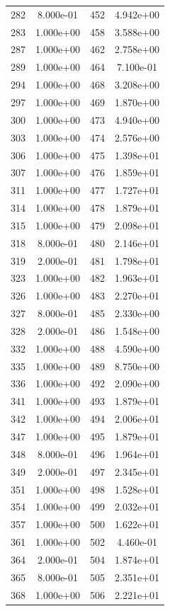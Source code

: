 \documentclass[12pt]{article}
\begin{document}
\begin{longtable}{@{}cccc@{}}
282 & 8.000e-01 & 452 & 4.942e+00 \\
283 & 1.000e+00 & 458 & 3.588e+00 \\
287 & 1.000e+00 & 462 & 2.758e+00 \\
289 & 1.000e+00 & 464 & 7.100e-01 \\
294 & 1.000e+00 & 468 & 3.208e+00 \\
297 & 1.000e+00 & 469 & 1.870e+00 \\
300 & 1.000e+00 & 473 & 4.940e+00 \\
303 & 1.000e+00 & 474 & 2.576e+00 \\
306 & 1.000e+00 & 475 & 1.398e+01 \\
307 & 1.000e+00 & 476 & 1.859e+01 \\
311 & 1.000e+00 & 477 & 1.727e+01 \\
314 & 1.000e+00 & 478 & 1.879e+01 \\
315 & 1.000e+00 & 479 & 2.098e+01 \\
318 & 8.000e-01 & 480 & 2.146e+01 \\
319 & 2.000e-01 & 481 & 1.798e+01 \\
323 & 1.000e+00 & 482 & 1.963e+01 \\
326 & 1.000e+00 & 483 & 2.270e+01 \\
327 & 8.000e-01 & 485 & 2.330e+00 \\
328 & 2.000e-01 & 486 & 1.548e+00 \\
332 & 1.000e+00 & 488 & 4.590e+00 \\
335 & 1.000e+00 & 489 & 8.750e+00 \\
336 & 1.000e+00 & 492 & 2.090e+00 \\
341 & 1.000e+00 & 493 & 1.879e+01 \\
342 & 1.000e+00 & 494 & 2.006e+01 \\
347 & 1.000e+00 & 495 & 1.879e+01 \\
348 & 8.000e-01 & 496 & 1.964e+01 \\
349 & 2.000e-01 & 497 & 2.345e+01 \\
351 & 1.000e+00 & 498 & 1.528e+01 \\
354 & 1.000e+00 & 499 & 2.032e+01 \\
357 & 1.000e+00 & 500 & 1.622e+01 \\
361 & 1.000e+00 & 502 & 4.460e-01 \\
364 & 2.000e-01 & 504 & 1.874e+01 \\
365 & 8.000e-01 & 505 & 2.351e+01 \\
368 & 1.000e+00 & 506 & 2.221e+01 \\

\end{longtable}
\end{document}
